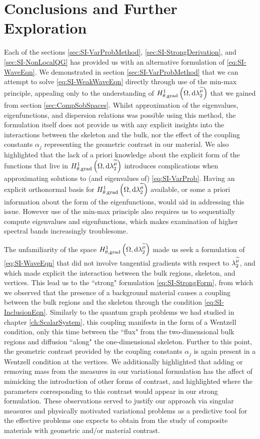 \section{Conclusions and Further Exploration} \label{sec:SI-Conc}
Each of the sections \ref{sec:SI-VarProbMethod}, \ref{sec:SI-StrongDerivation}, and \ref{sec:SI-NonLocalQG} has provided us with an alternative formulation of \eqref{eq:SI-WaveEqn}.
We demonstrated in section \ref{sec:SI-VarProbMethod} that we can attempt to solve \eqref{eq:SI-WeakWaveEqn} directly through use of the min-max principle, appealing only to the understanding of $H^1_{\theta, \mathrm{grad}}\left( \Omega, \mathrm{d}\lambda_2^{\widetilde{\mu}} \right)$ that we gained from section \ref{sec:CompSobSpaces}.
Whilst approximation of the eigenvalues, eigenfunctions, and dispersion relations was possible using this method, the formulation itself does not provide us with any explicit insights into the interactions between the skeleton and the bulk, nor the effect of the coupling constants $\alpha_j$ representing the geometric contrast in our material.
We also highlighted that the lack of a priori knowledge about the explicit form of the functions that live in $H^1_{\theta, \mathrm{grad}}\left( \Omega, \mathrm{d}\lambda_2^{\widetilde{\mu}} \right)$ introduces complications when approximating solutions to (and eigenvalues of) \eqref{eq:SI-VarProb}.
Having an explicit orthonormal basis for $H^1_{\theta, \mathrm{grad}}\left( \Omega, \mathrm{d}\lambda_2^{\widetilde{\mu}} \right)$ available, or some a priori information about the form of the eigenfunctions, would aid in addressing this issue.
However use of the min-max principle also requires us to sequentially compute eigenvalues and eigenfunctions, which makes examination of higher spectral bands increasingly troublesome.

The unfamiliarity of the space $H^1_{\theta, \mathrm{grad}}\left( \Omega, \mathrm{d}\lambda_2^{\widetilde{\mu}} \right)$ made us seek a formulation of \eqref{eq:SI-WaveEqn} that did not involve tangential gradients with respect to $\lambda_2^{\widetilde{\mu}}$, and which made explicit the interaction between the bulk regions, skeleton, and vertices.
This lead us to the ``strong" formulation \eqref{eq:SI-StrongForm}, from which we observed that the presence of a background material causes a coupling between the bulk regions and the skeleton through the condition \eqref{eq:SI-InclusionEqn}.
Similarly to the quantum graph problems we had studied in chapter \ref{ch:ScalarSystem}, this coupling manifests in the form of a Wentzell condition, only this time between the ``flux" from the two-dimensional bulk regions and diffusion ``along" the one-dimensional skeleton.
Further to this point, the geometric contrast provided by the coupling constants $\alpha_j$ is again present in a Wentzell condition at the vertices.
We additionally highlighted that adding or removing mass from the measures in our variational formulation has the affect of mimicking the introduction of other forms of contrast, and highlighted where the parameters corresponding to this contrast would appear in our strong formulation.
These observations served to justify our approach via singular measures and physically motivated variational problems as a predictive tool for the effective problems one expects to obtain from the study of composite materials with geometric and/or material contrast.

